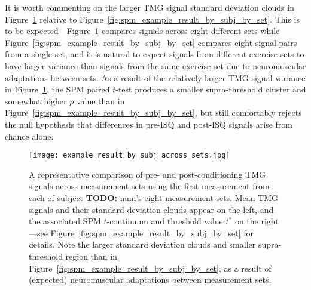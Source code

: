 \documentclass[utf8]{style/FrontiersinHarvard}
\newcommand{\TODO}[1]{{\textbf{TODO:} {\color{red} #1}}}
\begin{document}
It is worth commenting on the larger TMG signal standard deviation clouds in Figure~\ref{fig:spm_example_result_by_subj_across_sets} relative to Figure~\ref{fig:spm_example_result_by_subj_by_set}.
This is to be expected---Figure~\ref{fig:spm_example_result_by_subj_across_sets} compares signals across eight different sets while Figure~\ref{fig:spm_example_result_by_subj_by_set} compares eight signal pairs from a single set, and it is natural to expect signals from different exercise sets to have larger variance than signals from the same exercise set due to neuromuscular adaptations between sets.
As a result of the relatively larger TMG signal variance in Figure~\ref{fig:spm_example_result_by_subj_across_sets}, the SPM paired $ t $-test produces a smaller supra-threshold cluster and somewhat higher $ p $ value than in Figure~\ref{fig:spm_example_result_by_subj_by_set}, but still comfortably rejects the null hypothesis that differences in pre-ISQ and post-ISQ signals arise from chance alone.

\begin{table}[htb!]
    \centering
    \caption{A statistical comparison of pre-ISQ and post-ISQ TMG parameters across measurement sets using the first measurement from each of subject \TODO{num}'s eight measurement sets.
    Note the generally larger standard deviations in parameter values relative to Table~\ref{tab:tmg_params_by_subj_by_set}, in which parameter values all come from one set (rather than eight),
    mirroring the trend in Figures~\ref{fig:spm_example_result_by_subj_by_set} and~\ref{fig:spm_example_result_by_subj_across_sets}.}
    \vspace{1ex}
    \renewcommand{\arraystretch}{1.2}
    
    \label{tab:tmg_params_by_subj_across_sets}
\end{table}

\begin{figure}
	\centering
    \texttt{[image: example\_result\_by\_subj\_across\_sets.jpg]}
    \caption{A representative comparison of pre- and post-conditioning TMG signals across measurement sets using the first measurement from each of subject \TODO{num}'s eight measurement sets.
    Mean TMG signals and their standard deviation clouds appear on the left, and the associated SPM $ t $-continuum and threshold value $ t^{*} $ on the right---see Figure~\ref{fig:spm_example_result_by_subj_by_set} for details.
    Note the larger standard deviation clouds and smaller supra-threshold region than in Figure~\ref{fig:spm_example_result_by_subj_by_set}, as a result of (expected) neuromuscular adaptations between measurement sets.}
    \label{fig:spm_example_result_by_subj_across_sets}
\end{figure}
\end{document}

